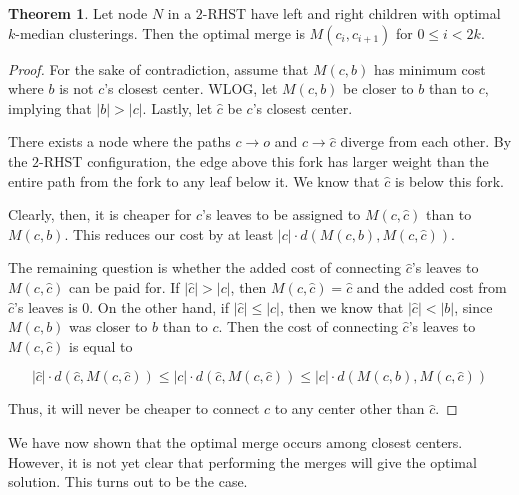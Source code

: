 \documentclass{article}
\theoremstyle{definition}
\newtheorem{theorem}{Theorem}
\begin{document}
\begin{theorem}
    Let node $N$ in a $2$-RHST have left and right children with optimal $k$-median clusterings. Then the optimal merge is $M(c_i, c_{i+1})$ for $0 \leq i < 2k$.
\end{theorem}
\begin{proof}
    For the sake of contradiction, assume that $M(c, b)$ has minimum cost where $b$ is not $c$'s closest center. WLOG, let $M(c, b)$ be closer to $b$
    than to $c$, implying that $|b| > |c|$. Lastly, let $\hat{c}$ be $c$'s closest center.

    There exists a node where the paths $c \rightarrow o$ and $c \rightarrow \hat{c}$ diverge from each other. By the $2$-RHST configuration, the edge above
    this fork has larger weight than the entire path from the fork to any leaf below it. We know that $\hat{c}$ is below this fork.

    Clearly, then, it is cheaper for $c$'s leaves to be assigned to $M(c, \hat{c})$ than to $M(c, b)$. This reduces our cost by at least $|c| \cdot
    d\left(M(c, b), M(c, \hat{c})\right)$.

    The remaining question is whether the added cost of connecting $\hat{c}$'s leaves to $M(c, \hat{c})$ can be paid for.  If
    $|\hat{c}| > |c|$, then $M(c, \hat{c}) = \hat{c}$ and the added cost from $\hat{c}$'s leaves is 0. On the other hand, if $|\hat{c}| \leq |c|$, then we
    know that $|\hat{c}| < |b|$, since $M(c, b)$ was closer to $b$ than to $c$. Then the cost of connecting $\hat{c}$'s leaves to $M(c, \hat{c})$ is equal
    to

    \[ |\hat{c}| \cdot d(\hat{c}, M(c, \hat{c})) \leq |c| \cdot d(\hat{c}, M(c, \hat{c})) \leq |c| \cdot d\left(M(c, b), M(c, \hat{c})\right) \]

    Thus, it will never be cheaper to connect $c$ to any center other than $\hat{c}$.
\end{proof}

We have now shown that the optimal merge occurs among closest centers. However, it is not yet clear that performing the merges will give the optimal
solution. This turns out to be the case.
\end{document}
